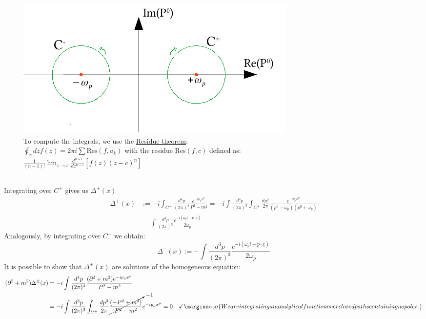 \documentclass[../main.tex]{subfiles}
\begin{document}
\begin{figure}[h!]
    \includegraphics{Images/CamminiIntegrazione.pdf}
    \caption*{To compute the integrals, we use the \href{https://en.wikipedia.org/wiki/Residue_theorem}{Residue theorem}:\\ $\oint_\gamma dzf(z)=2\pi i\sum\text{Res}(f,a_k)$ with the residue Res$(f,c)$ defined as:\\$\frac{1}{(n-1)!}\lim_{z\to c}\frac{d^{n-1}}{dz^{n-1}}[f(z)(z-c)^n]$}
\end{figure}\\
\noindent
Integrating over $C^+$ gives us $\Delta^+(x)$
\begin{align*}
\Delta^+(x)&:=-i\int_{C^+}\frac{d^4p}{(2\pi)^4}\frac{e^{-ip_\mu x^\mu}}{P^2-m^2}=-i\int\frac{d^3p}{(2\pi)^3}\int_{C^+}\frac{dp^0}{2\pi}\frac{e^{-ip_\mu x^\mu}}{(p^0-\omega_p)(p^0+\omega_p)}\\
&=\int\frac{d^3p}{(2\pi)^3}\frac{e^{-i(\omega_pt-\underline{p}\cdot\underline{x})}}{2\omega_p}
\end{align*}
Analogously, by integrating over $C^-$ we obtain:
\[
\Delta^-(x):=-\int\frac{d^3p}{(2\pi)^3}\frac{e^{+i(\omega_pt+\underline{p}\cdot\underline{x})}}{2\omega_p}
\]
It is possible to show that $\Delta^\pm(x)$ are solutions of the homogeneous equation:
\begin{align*}
(\partial^2+m^2)\Delta^\pm(x)&=-i\int\frac{d^4p}{(2\pi)^4}\frac{(\partial^2+m^2)e^{-ip_\mu x^\mu}}{P^2-m^2}\\
&=-i\int\frac{d^3p}{(2\pi)^3}\int_{C^\pm}\frac{dp^0}{2\pi}\cancelto{-1}{\frac{(-P^2+m^2)}{P^2-m^2}}e^{-ip_\mu x^\mu}=0\quad \checkmark\marginnote{We are integrating an analytical function over closed paths containing no poles.}
\end{align*}
\end{document}
